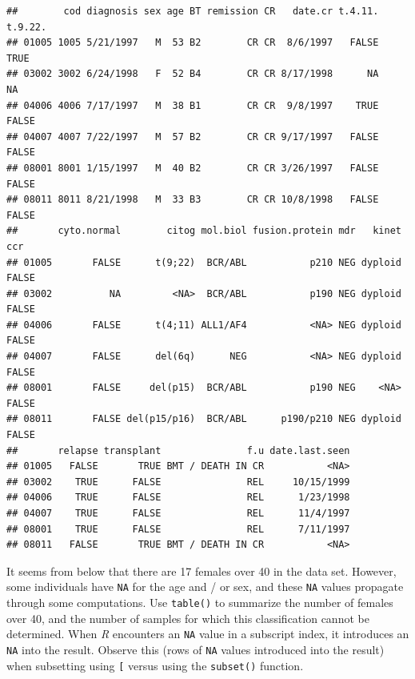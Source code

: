 \documentclass[]{article}
\newenvironment{Shaded}{\begin{snugshade}}{\end{snugshade}}
\newcommand{\KeywordTok}[1]{\textcolor[rgb]{0.13,0.29,0.53}{\textbf{#1}}}
\newcommand{\DataTypeTok}[1]{\textcolor[rgb]{0.13,0.29,0.53}{#1}}
\newcommand{\DecValTok}[1]{\textcolor[rgb]{0.00,0.00,0.81}{#1}}
\newcommand{\StringTok}[1]{\textcolor[rgb]{0.31,0.60,0.02}{#1}}
\newcommand{\OperatorTok}[1]{\textcolor[rgb]{0.81,0.36,0.00}{\textbf{#1}}}
\newcommand{\NormalTok}[1]{#1}
\theoremstyle{definition}
\theoremstyle{definition}
\theoremstyle{remark}
\begin{document}
\begin{verbatim}
##        cod diagnosis sex age BT remission CR   date.cr t.4.11. t.9.22.
## 01005 1005 5/21/1997   M  53 B2        CR CR  8/6/1997   FALSE    TRUE
## 03002 3002 6/24/1998   F  52 B4        CR CR 8/17/1998      NA      NA
## 04006 4006 7/17/1997   M  38 B1        CR CR  9/8/1997    TRUE   FALSE
## 04007 4007 7/22/1997   M  57 B2        CR CR 9/17/1997   FALSE   FALSE
## 08001 8001 1/15/1997   M  40 B2        CR CR 3/26/1997   FALSE   FALSE
## 08011 8011 8/21/1998   M  33 B3        CR CR 10/8/1998   FALSE   FALSE
##       cyto.normal        citog mol.biol fusion.protein mdr   kinet   ccr
## 01005       FALSE      t(9;22)  BCR/ABL           p210 NEG dyploid FALSE
## 03002          NA         <NA>  BCR/ABL           p190 NEG dyploid FALSE
## 04006       FALSE      t(4;11) ALL1/AF4           <NA> NEG dyploid FALSE
## 04007       FALSE      del(6q)      NEG           <NA> NEG dyploid FALSE
## 08001       FALSE     del(p15)  BCR/ABL           p190 NEG    <NA> FALSE
## 08011       FALSE del(p15/p16)  BCR/ABL      p190/p210 NEG dyploid FALSE
##       relapse transplant               f.u date.last.seen
## 01005   FALSE       TRUE BMT / DEATH IN CR           <NA>
## 03002    TRUE      FALSE               REL     10/15/1999
## 04006    TRUE      FALSE               REL      1/23/1998
## 04007    TRUE      FALSE               REL      11/4/1997
## 08001    TRUE      FALSE               REL      7/11/1997
## 08011   FALSE       TRUE BMT / DEATH IN CR           <NA>
\end{verbatim}

It seems from below that there are 17 females over 40 in the data set.
However, some individuals have \texttt{NA} for the age and / or sex, and
these \texttt{NA} values propagate through some computations. Use
\texttt{table()} to summarize the number of females over 40, and the
number of samples for which this classification cannot be determined.
When \emph{R} encounters an \texttt{NA} value in a subscript index, it
introduces an \texttt{NA} into the result. Observe this (rows of
\texttt{NA} values introduced into the result) when subsetting using
\texttt{{[}} versus using the \texttt{subset()} function.

\begin{Shaded}
\end{Shaded}
\end{document}
